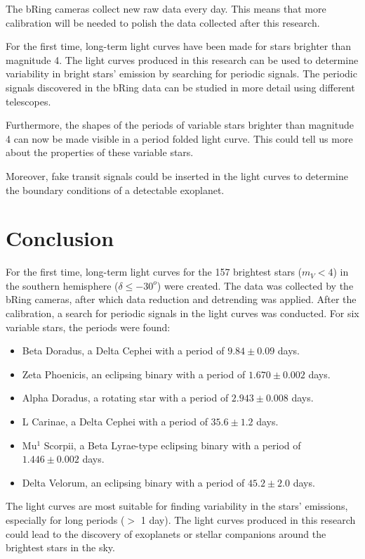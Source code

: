 \documentclass[onecolumn]{aa} %
\begin{document}
The bRing cameras collect new raw data every day. This means that more calibration will be needed to polish the data collected after this research.

For the first time, long-term light curves have been made for stars brighter than magnitude 4. The light curves produced in this research can be used to determine variability in bright stars' emission by searching for periodic signals. The periodic signals discovered in the bRing data can be studied in more detail using different telescopes.

Furthermore, the shapes of the periods of variable stars brighter than magnitude 4 can now be made visible in a period folded light curve. This could tell us more about the properties of these variable stars.

Moreover, fake transit signals could be inserted in the light curves to determine the boundary conditions of a detectable exoplanet. 



\section{Conclusion}
\label{sec:conclusion}
For the first time, long-term light curves for the 157 brightest stars ($m_V < 4$) in the southern hemisphere ($\delta \leq -30^o$) were created.
The data was collected by the bRing cameras, after which data reduction and detrending was applied. After the calibration, a search for periodic signals in the light curves was conducted. For six variable stars, the periods were found: 
\begin{itemize}
    \item Beta Doradus, a Delta Cephei with a period of $9.84 \pm 0.09$ days.
    \item Zeta Phoenicis, an eclipsing binary with a period of $1.670 \pm 0.002$ days.
    \item Alpha Doradus, a rotating star with a period of $2.943 \pm 0.008$ days.
    \item L Carinae, a Delta Cephei with a period of $35.6 \pm 1.2$ days.
    \item Mu$^1$ Scorpii, a Beta Lyrae-type eclipsing binary with a period of $1.446 \pm 0.002$ days.
    \item Delta Velorum, an eclipsing binary with a period of $45.2 \pm 2.0$ days.
\end{itemize}
The light curves are most suitable for finding variability in the stars' emissions, especially for long periods ($>$ 1 day). The light curves produced in this research could lead to the discovery of exoplanets or stellar companions around the brightest stars in the sky.
\end{document}
